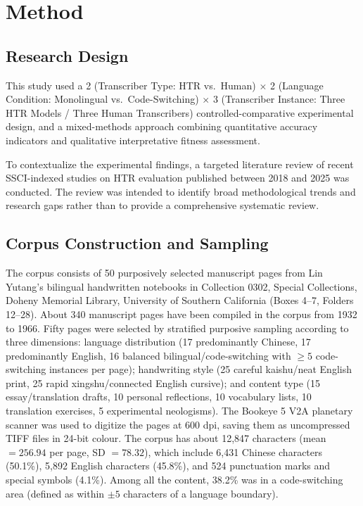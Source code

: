 \documentclass[final]{anthology-ch} %
\begin{document}
\section{Method} \label{sec:method}

\subsection{Research Design}

This study used a 2 (Transcriber Type: HTR vs.\ Human) $\times$ 2 (Language Condition: Monolingual vs.\ Code-Switching) $\times$ 3 (Transcriber Instance: Three HTR Models / Three Human Transcribers) controlled-comparative experimental design, and a mixed-methods approach combining quantitative accuracy indicators and qualitative interpretative fitness assessment.

To contextualize the experimental findings, a targeted literature review of recent SSCI-indexed studies on HTR evaluation published between 2018 and 2025 was conducted. The review was intended to identify broad methodological trends and research gaps rather than to provide a comprehensive systematic review.

\subsection{Corpus Construction and Sampling}

The corpus consists of 50 purposively selected manuscript pages from Lin Yutang's bilingual handwritten notebooks in Collection 0302, Special Collections, Doheny Memorial Library, University of Southern California (Boxes 4--7, Folders 12--28). About 340 manuscript pages have been compiled in the corpus from 1932 to 1966. Fifty pages were selected by stratified purposive sampling according to three dimensions: language distribution (17 predominantly Chinese, 17 predominantly English, 16 balanced bilingual/code-switching with $\geq 5$ code-switching instances per page); handwriting style (25 careful kaishu/neat English print, 25 rapid xingshu/connected English cursive); and content type (15 essay/translation drafts, 10 personal reflections, 10 vocabulary lists, 10 translation exercises, 5 experimental neologisms). The Bookeye 5 V2A planetary scanner was used to digitize the pages at 600 dpi, saving them as uncompressed TIFF files in 24-bit colour. The corpus has about 12,847 characters (mean $= 256.94$ per page, SD $= 78.32$), which include 6,431 Chinese characters (50.1\%), 5,892 English characters (45.8\%), and 524 punctuation marks and special symbols (4.1\%). Among all the content, 38.2\% was in a code-switching area (defined as within $\pm5$ characters of a language boundary).
\end{document}
